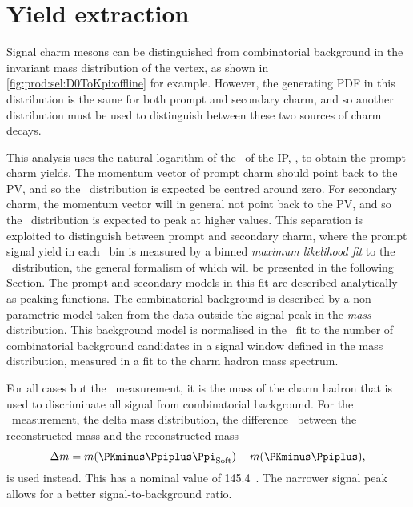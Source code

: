 \chapter{Yield extraction}
\label{chap:prod:fitting}

Signal charm mesons can be distinguished from combinatorial background in the 
invariant mass distribution of the vertex, as shown in 
\cref{fig:prod:sel:D0ToKpi:offline} for example.
However, the generating \acf{PDF} in this distribution is the same for both 
prompt and secondary charm, and so another distribution must be used to 
distinguish between these two sources of charm decays.

This analysis uses the natural logarithm of the \chisq\ of the \acf{IP}, 
\lnipchisq, to obtain the prompt charm yields.
The momentum vector of prompt charm should point back to the \acf{PV}, and so 
the \lnipchisq\ distribution is expected be centred around zero.
For secondary charm, the momentum vector will in general not point back to the 
\ac{PV}, and so the \lnipchisq\ distribution is expected to peak at higher 
values.
This separation is exploited to distinguish between prompt and secondary charm, 
where the prompt signal yield in each \pTy\ bin is measured by a binned 
\emph{maximum likelihood fit} to the \lnipchisq\ distribution, the general 
formalism of which will be presented in the following Section.
The prompt and secondary models in this fit are described analytically as 
peaking functions.
The combinatorial background is described by a non-parametric model taken from 
the data outside the signal peak in the \emph{mass} distribution.
This background model is normalised in the \lnipchisq\ fit to the number of 
combinatorial background candidates in a signal window defined in the mass 
distribution, measured in a fit to the charm hadron mass spectrum.

For all cases but the \PDstarp\ measurement, it is the mass of the charm hadron 
that is used to discriminate all signal from combinatorial background.
For the \PDstarp\ measurement, the delta mass distribution, the difference 
\deltam\ between the reconstructed \PDstarp mass and the reconstructed \PDzero 
mass
\begin{equation}
  \deltam = m(\PKminus\Ppiplus\Ppiplussoft) - m(\PKminus\Ppiplus),
  \label{eqn:prod:fitting:delta_mass}
\end{equation}
is used instead.
This has a nominal value of \SI{145.4}{\MeVcc}~\cite{PDG2014}.
The narrower signal peak allows for a better signal-to-background ratio.

